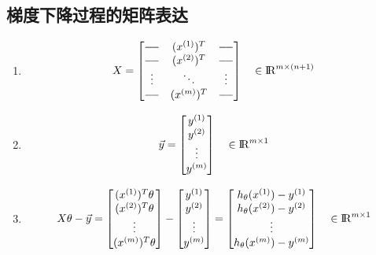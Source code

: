 \subsection{梯度下降过程的矩阵表达}
\begin{enumerate}
	\item 
	\begin{equation}
		X = \left[\begin{matrix}
		-\!-  & (x^{(1)})^T & -\!- \\
		-\!- & (x^{(2)})^T & -\!- \\
		\vdots & \ddots & \vdots \\
		-\!- & (x^{(m)})^T & -\!- \\
		\end{matrix}\right] \quad \in {\rm I\!R}^{m \times (n+1)}
	\end{equation}

	\item 
	\begin{equation}
		\vec{y} = \left[\begin{matrix}
		y^{(1)} \\ y^{(2)} \\ \vdots \\ y^{(m)}
		\end{matrix}\right] \quad \in {\rm I\!R}^{m \times 1}
	\end{equation}

	\item 
	\begin{equation}
		X\theta - \vec{y} = \left[\begin{matrix}
		(x^{(1)})^T\theta \\ (x^{(2)})^T\theta \\ \vdots \\ (x^{(m)})^T\theta
		\end{matrix}\right] - \left[\begin{matrix}
		y^{(1)} \\ y^{(2)} \\ \vdots \\ y^{(m)}
		\end{matrix}\right] = \left[\begin{matrix}
		h_\theta(x^{(1)}) - y^{(1)} \\ h_\theta(x^{(2)}) - y^{(2)} \\ \vdots \\ h_\theta(x^{(m)}) - y^{(m)}
		\end{matrix}\right]  \quad \in {\rm I\!R}^{m \times 1}
	\end{equation}


\end{enumerate}
